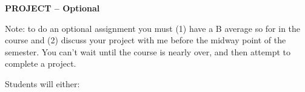 \documentclass{article}
\begin{document}
\begin{center}
{\bf PROJECT -- Optional}
\end{center}
Note:  to do an optional assignment you must (1) have a B average so for in the course and (2) discuss your project with me before the midway point of the semester.  You can't wait until the course is nearly over, and then attempt to complete a project.

Students will either:
\end{document}
